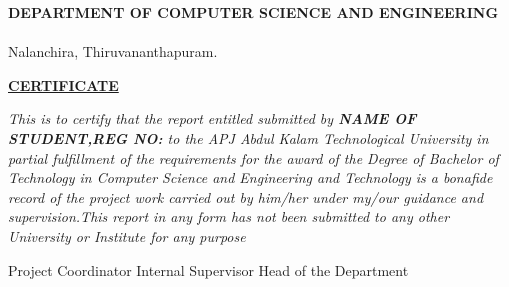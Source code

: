 
\setlength{\headsep}{0.4in}
\begin{center}

{\sf \textbf{\textcolor[rgb]{0,0,0}{DEPARTMENT OF COMPUTER SCIENCE AND ENGINEERING}}}\\[0.5ex]
{}\\[0.4ex]
Nalanchira, Thiruvananthapuram.



\end{center}


\vspace{0.15cm}
 \begin{figure}[!h]
 \begin{center}
 \end{center}
 \end{figure}
\vspace{0.02cm}

\begin{center}
\textcolor[rgb]{0,0,0}{\textbf{\underline{CERTIFICATE}}} \\[1ex]
\end{center}
\par
\emph{
\textit{{This is to certify that the report entitled \textbf{\projectName}  submitted by \textbf{NAME OF STUDENT,REG NO:} to the APJ Abdul Kalam Technological University in partial fulfillment of the
		requirements for the award of the Degree of {Bachelor of Technology} in {Computer Science and Engineering and Technology} is a bonafide record of the project work carried out by him/her under my/our guidance and supervision.This report in any form has not been submitted to any other University or Institute for any purpose}}} 



\vspace{1.0 cm}
\vspace{1.5 cm}
\vspace{1.0 cm}
\vspace{1.5 cm}

Project Coordinator		\hspace{0.8 cm}	Internal Supervisor		\hspace{1.5 cm}	Head of the Department






